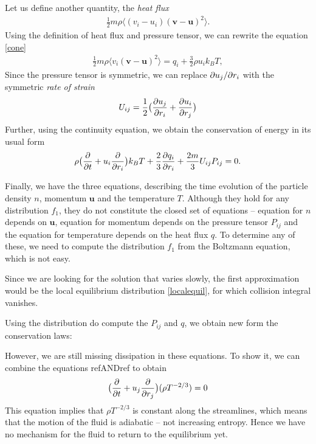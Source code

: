 Let us define another quantity, the \textit{heat flux}
\begin{align*}
\frac{1}{2} m \rho \langle (v_i - u_i)(\bm{v} - \bm{u})^2 \rangle.
\end{align*}
Using the definition of heat flux and pressure tensor, we can rewrite the equation \ref{cone}
\begin{align*}
\frac{1}{2}m \rho \langle v_i (\bm{v} - \bm{u})^2 \rangle = q_i + \frac{3}{2}\rho u_ik_B T,
\end{align*}
Since the pressure tensor is symmetric, we can replace $\partial u_j / \partial r_i$ with the symmetric \textit{rate of strain}
\begin{align*}
U_{ij} = \frac{1}{2}\big( \frac{\partial u_j}{\partial r_i} + \frac{\partial u_i}{\partial r_j} \big)
\end{align*}
Further, using the continuity equation, we obtain the conservation of energy in its usual form
\begin{align*}
\rho \big( \frac{\partial}{\partial t} + u_i \frac{\partial}{\partial r_i} \big) k_B T + \frac{2}{3} \frac{\partial q_i}{\partial r_i} + \frac{2m}{3} U_{ij} P_{ij} = 0.
\end{align*}

Finally, we have the three equations, describing the time evolution of the particle density $n$, momentum $\bm{u}$ and the temperature $T$.
Although they hold for any distribution $f_1$, they do not constitute the closed set of equations -- equation for $n$ depends on $\bm{u}$, equation for momentum depends on the pressure tensor $P_{ij}$ and the equation for temperature depends on the heat flux $q$. To determine any of these, we need to compute the distribution $f_1$ from the Boltzmann equation, which is not easy.

\bigskip

Since we are looking for the solution that varies slowly, the first approximation would be the  local equilibrium distribution \ref{localequil}, for which collision integral vanishes.
%

Using the distribution do compute the $P_{ij}$ and $q$, we obtain new form the conservation laws:

However, we are still missing dissipation in these equations. To show it, we can combine the equations refANDref to obtain
\begin{align*}
\big( \frac{\partial}{\partial t} + u_j \frac{\partial}{\partial r_j} \big) (\rho T ^{-2/3}) = 0
\end{align*}
This equation implies that $\rho T^{-2/3}$ is constant along the streamlines, which means that the motion of the fluid is adiabatic -- not increasing entropy. Hence we have no mechanism for the fluid to return to the equilibrium yet.

